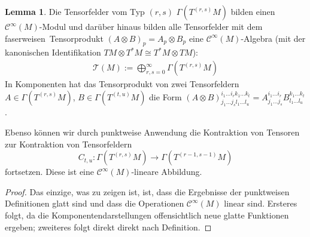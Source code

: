 \documentclass[a4paper]{scrbook}
\numberwithin{equation}{chapter}
\newcommand{\sC}{\mathcal{C}^{\infty}}
\theoremstyle{definition}
\newtheorem{lemma}[defn]{Lemma}
\begin{document}
		\begin{lemma}
			Die Tensorfelder vom Typ $(r,s)$ $\Gamma(T^{(r,s)}M)$ bilden einen $\sC(M)$-Modul und darüber hinaus bilden alle Tensorfelder mit dem \glqq faserweisen\grqq\ Tensorprodukt $(A\otimes B)_p=A_p\otimes B_p$ eine $\sC(M)$-Algebra (mit der kanonischen Identifikation $TM\otimes T^*M\cong T^*M\otimes TM$):
			\begin{align*}
				\mathcal{T}(M):=\bigoplus_{r,s=0}^{\infty}\Gamma(T^{(r,s)}M)
			\end{align*}
			In Komponenten hat das Tensorprodukt von zwei Tensorfeldern $A \in \Gamma(T^{(r,s)}M)$, $B \in \Gamma(T^{(t,u)}M)$ die Form $(A\otimes B)^{i_1 \dots i_r k_1 \dots k_t}_{j_1 \dots j_s l_1 \dots l_u} = A^{i_1 \dots i_r}_{j_1 \dots j_s} B^{k_1 \dots k_t}_{l_1 \dots l_u}$.
			
			Ebenso können wir durch punktweise Anwendung die Kontraktion von Tensoren zur Kontraktion von Tensorfeldern
			\[C_{t,u}\colon \Gamma(T^{(r,s)}M) \to \Gamma(T^{(r-1,s-1)}M)\]
			fortsetzen. Diese ist eine $\sC(M)$-lineare Abbildung.
			
			\begin{proof}
				Das einzige, was zu zeigen ist, ist, dass die Ergebnisse der punktweisen Definitionen glatt sind und dass die Operationen $\sC(M)$ linear sind. Ersteres folgt, da die Komponentendarstellungen offensichtlich neue glatte Funktionen ergeben; zweiteres folgt direkt direkt nach Definition.
			\end{proof}
		\end{lemma}
\end{document}
